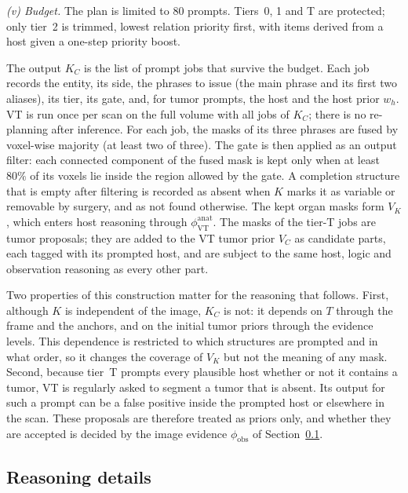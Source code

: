 \documentclass[fleqn,10pt]{olplainarticle}
\begin{document}
\emph{(v) Budget.} The plan is limited to $80$ prompts. Tiers~0, 1 and T are protected; only tier~2 is trimmed, lowest relation
priority first, with items derived from a host given a one-step priority boost.

The output $K_C$ is the list of prompt jobs that survive the budget. Each job records the entity, its side, the phrases to
issue (the main phrase and its first two aliases), its tier, its gate, and, for tumor prompts, the host and the host
prior $w_h$. VT is run once per scan on the full volume with all jobs of $K_C$; there is no re-planning after inference.
For each job, the masks of its three phrases are fused by voxel-wise majority (at least two of three). The gate is then
applied as an output filter: each connected component of the fused mask is kept only when at least $80\%$ of its
voxels lie inside the region allowed by the gate. A completion structure that is empty after filtering is recorded as
absent when $K$ marks it as variable or removable by surgery, and as not found otherwise. The kept organ masks form $V_K$, which enters host reasoning
through $\phi^{\mathrm{anat}}_{\mathrm{VT}}$. The masks of the tier-T jobs are tumor proposals; they are added to the VT
tumor prior $V_C$ as candidate parts, each tagged with its prompted host, and are subject to the same host, logic and
observation reasoning as every other part.

Two properties of this construction matter for the reasoning that follows. First, although $K$ is independent of the
image, $K_C$ is not: it depends on $T$ through the frame and the anchors, and on the initial tumor priors through the
evidence levels. This dependence is restricted to which structures are prompted and in what order, so it changes the
coverage of $V_K$ but not the meaning of any mask. Second, because tier~T prompts every plausible host whether or not it
contains a tumor, VT is regularly asked to segment a tumor that is absent. Its output for such a prompt can be a false
positive inside the prompted host or elsewhere in the scan. These proposals are therefore treated as priors only, and
whether they are accepted is decided by the image evidence $\phi_{\mathrm{obs}}$ of
Section~\ref{sec:reasoning_details}.

\subsection{Reasoning details}
\label{sec:reasoning_details}
\end{document}
